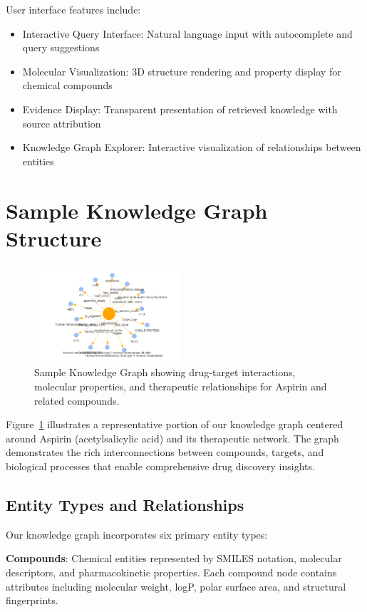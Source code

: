 \documentclass[conference]{IEEEtran}
\begin{document}
User interface features include:
\begin{itemize}
\item Interactive Query Interface: Natural language input with autocomplete and query suggestions
\item Molecular Visualization: 3D structure rendering and property display for chemical compounds
\item Evidence Display: Transparent presentation of retrieved knowledge with source attribution
\item Knowledge Graph Explorer: Interactive visualization of relationships between entities
\end{itemize}

\section{Sample Knowledge Graph Structure}

\begin{figure}[h]
\centering
\includegraphics[width=0.48\textwidth]{sample_kg.png}
\caption{Sample Knowledge Graph showing drug-target interactions, molecular properties, and therapeutic relationships for Aspirin and related compounds.}
\label{fig:sample_kg}
\end{figure}

Figure~\ref{fig:sample_kg} illustrates a representative portion of our knowledge graph centered around Aspirin (acetylsalicylic acid) and its therapeutic network. The graph demonstrates the rich interconnections between compounds, targets, and biological processes that enable comprehensive drug discovery insights.

\subsection{Entity Types and Relationships}

Our knowledge graph incorporates six primary entity types:

\textbf{Compounds}: Chemical entities represented by SMILES notation, molecular descriptors, and pharmacokinetic properties. Each compound node contains attributes including molecular weight, logP, polar surface area, and structural fingerprints.
\end{document}
